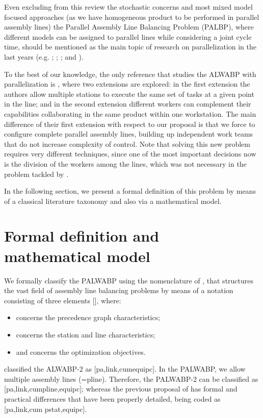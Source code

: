 \documentclass{singlecol-new}
\begin{document}
Even excluding from this review the stochastic concerns and most mixed model focused approaches (as we have homogeneous product to be performed in parallel assembly lines) the Parallel Assembly Line Balancing Problem (PALBP), where different models can be assigned to parallel lines while considering a joint cycle time, should be mentioned as the main topic of research on parallelization in the last years (e.g. \cite{gokcen06balancing}; \cite{scholl09designing}; \cite{kara2010balancing}; and \cite{ozbakir11multiple}).

To the best of our knowledge, the only reference that studies the ALWABP with parallelization is \citep{araujo12two}, where two extensions are explored: in the first extension the authors allow multiple stations to execute the same set of tasks at a given point in the line; and in the second extension different workers can complement their capabilities collaborating in the same product within one workstation. The main difference of their first extension with respect to our proposal is that we force to configure complete parallel assembly lines, building up independent work teams that do not increase complexity of control. Note that solving this new problem requires very different techniques, since one of the most important decisions now is the division of the workers among the lines, which was not necessary in the problem tackled by \cite{araujo12two}. 

In the following section, we present a formal definition of this problem by means of a classical literature taxonomy and also via a mathematical model.

\section{Formal definition and mathematical model} \label{problem}

We formally classify the PALWABP using the nomenclature of \cite{boysen07classification}, that structures the vast field of assembly line balancing problems by means of a notation consisting of three elements [], where: 
\begin{itemize}
	\item  concerns the precedence graph characteristics;
	\item  concerns the station and line characteristics;
	\item and  concerns the optimization objectives.
\end{itemize}

\cite{boysen07classification} classified the ALWABP-2 as [pa,link,cumequipc]. In the PALWABP, we allow multiple assembly lines (=pline). Therefore, the PALWABP-2 can be classified as [pa,link,cumpline,equipc]; whereas the previous proposal of \cite{araujo12two} has formal and practical differences that have been properly detailed, being coded as [pa,link,cum pstat,equipc].
\end{document}
